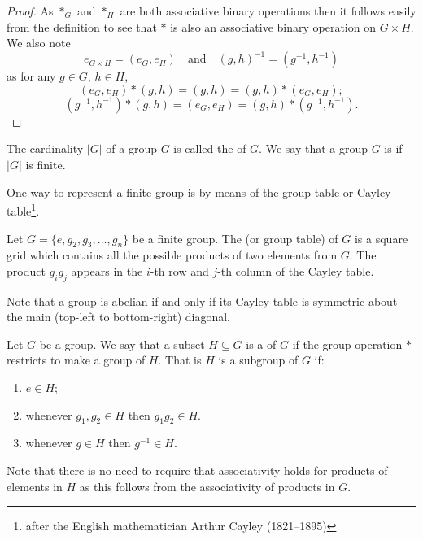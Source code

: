 \begin{proof}
As $\ast_G$ and $\ast_H$ are both associative binary operations then it follows easily from the definition to see that $\ast$ is also an associative binary operation on $G \times H$. We also note
\[ e_{G\times H}=(e_G,e_H) \quad \text{and} \quad (g,h)^{-1}=(g^{-1},h^{-1}) \]
as for any $g \in G$, $h \in H$,
\[ (e_G,e_H)\ast(g,h)=(g,h)=(g,h)\ast(e_G,e_H); \]
\[ (g^{-1},h^{-1})\ast(g,h)=(e_G,e_H)=(g,h)\ast(g^{-1},h^{-1}). \]
\end{proof}

\begin{definition}
The cardinality $|G|$ of a group $G$ is called the  of $G$. We say that a group $G$ is  if $|G|$ is finite.
\end{definition}

One way to represent a finite group is by means of the group table or Cayley table\footnote{after the English mathematician Arthur Cayley (1821--1895)}.

\begin{definition}
Let $G=\{e,g_2,g_3,\dots,g_n\}$ be a finite group. The  (or group table) of $G$ is a square grid which contains all the possible products of two elements from $G$. The product $g_ig_j$ appears in the $i$-th row and $j$-th column of the Cayley table.
\end{definition}

\begin{remark}
Note that a group is abelian if and only if its Cayley table is symmetric about the main (top-left to bottom-right) diagonal.
\end{remark}

\begin{definition}[Subgroup]
Let $G$ be a group. We say that a subset $H \subseteq G$ is a  of $G$ if the group operation $\ast$ restricts to make a group of $H$. That is $H$ is a subgroup of $G$ if:
\begin{enumerate}[label=(\roman*)]
\item $e \in H$;
\item whenever $g_1,g_2\in H$ then $g_1g_2 \in H$.
\item whenever $g \in H$ then $g^{-1} \in H$.
\end{enumerate}
\end{definition}

\begin{remark}
Note that there is no need to require that associativity holds for products of elements in $H$ as this follows from the associativity of products in $G$.
\end{remark}

